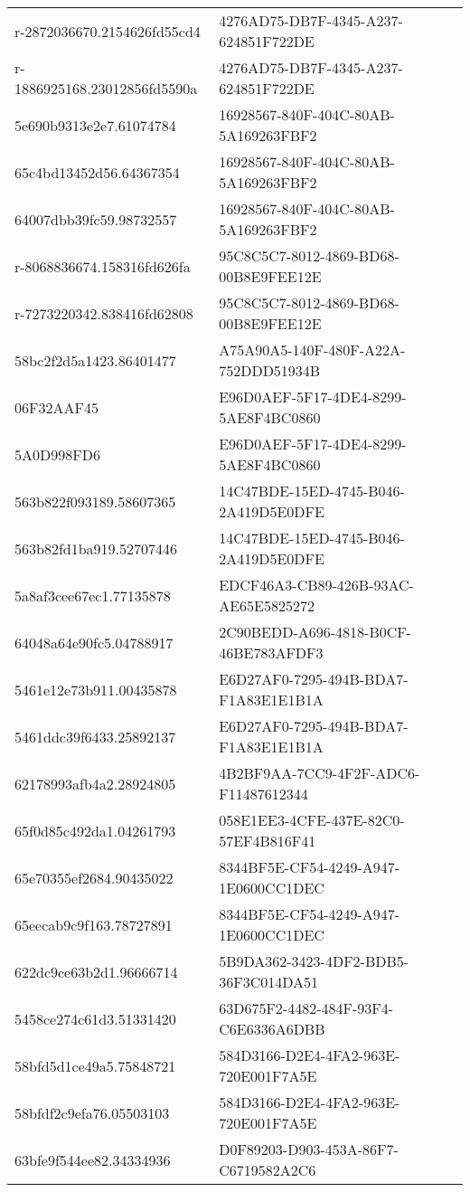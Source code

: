 \begin{tabular}{ll}
r-2872036670.2154626fd55cd4 & 4276AD75-DB7F-4345-A237-624851F722DE \\
r-1886925168.23012856fd5590a & 4276AD75-DB7F-4345-A237-624851F722DE \\
5e690b9313e2e7.61074784 & 16928567-840F-404C-80AB-5A169263FBF2 \\
65c4bd13452d56.64367354 & 16928567-840F-404C-80AB-5A169263FBF2 \\
64007dbb39fc59.98732557 & 16928567-840F-404C-80AB-5A169263FBF2 \\
r-8068836674.158316fd626fa & 95C8C5C7-8012-4869-BD68-00B8E9FEE12E \\
r-7273220342.838416fd62808 & 95C8C5C7-8012-4869-BD68-00B8E9FEE12E \\
58bc2f2d5a1423.86401477 & A75A90A5-140F-480F-A22A-752DDD51934B \\
06F32AAF45 & E96D0AEF-5F17-4DE4-8299-5AE8F4BC0860 \\
5A0D998FD6 & E96D0AEF-5F17-4DE4-8299-5AE8F4BC0860 \\
563b822f093189.58607365 & 14C47BDE-15ED-4745-B046-2A419D5E0DFE \\
563b82fd1ba919.52707446 & 14C47BDE-15ED-4745-B046-2A419D5E0DFE \\
5a8af3cee67ec1.77135878 & EDCF46A3-CB89-426B-93AC-AE65E5825272 \\
64048a64e90fc5.04788917 & 2C90BEDD-A696-4818-B0CF-46BE783AFDF3 \\
5461e12e73b911.00435878 & E6D27AF0-7295-494B-BDA7-F1A83E1E1B1A \\
5461ddc39f6433.25892137 & E6D27AF0-7295-494B-BDA7-F1A83E1E1B1A \\
62178993afb4a2.28924805 & 4B2BF9AA-7CC9-4F2F-ADC6-F11487612344 \\
65f0d85c492da1.04261793 & 058E1EE3-4CFE-437E-82C0-57EF4B816F41 \\
65e70355ef2684.90435022 & 8344BF5E-CF54-4249-A947-1E0600CC1DEC \\
65eecab9c9f163.78727891 & 8344BF5E-CF54-4249-A947-1E0600CC1DEC \\
622dc9ce63b2d1.96666714 & 5B9DA362-3423-4DF2-BDB5-36F3C014DA51 \\
5458ce274c61d3.51331420 & 63D675F2-4482-484F-93F4-C6E6336A6DBB \\
58bfd5d1ce49a5.75848721 & 584D3166-D2E4-4FA2-963E-720E001F7A5E \\
58bfdf2c9efa76.05503103 & 584D3166-D2E4-4FA2-963E-720E001F7A5E \\
63bfe9f544ee82.34334936 & D0F89203-D903-453A-86F7-C6719582A2C6 \\

\end{tabular}
